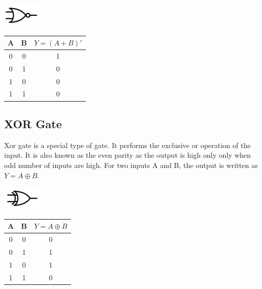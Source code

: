 \documentclass[a4paper, 12pt]{article}
\begin{document}
\begin{minipage}[c]{.5\textwidth}
  \centering
    \includegraphics{nor-gate}
\end{minipage}
\begin{minipage}{.5\textwidth}
  \begin{center}
    \begin{tabular}{ |c|c|c| }
      \hline
      A & B & $Y=(A + B)'$ \\
      \hline
      0 & 0 & 1 \\
      \hline
      0 & 1 & 0 \\
      \hline
      1 & 0 & 0 \\
      \hline
      1 & 1 & 0 \\
      \hline
    \end{tabular}
  \end{center}
\end{minipage}


\subsection{XOR Gate}
Xor gate is a special type of gate. It performs the exclusive or operation of the input. It is also known as the even parity as the output is high only only when odd number of inputs are high. For two inputs A and B, the output is written as $Y = A \oplus B$.

\begin{minipage}[c]{.5\textwidth}
  \centering
    \includegraphics{xor-gate}
\end{minipage}
\begin{minipage}{.5\textwidth}
  \begin{center}
    \begin{tabular}{ |c|c|c| }
      \hline
      A & B & $Y=A\oplus B$ \\
      \hline
      0 & 0 & 0 \\
      \hline
      0 & 1 & 1 \\
      \hline
      1 & 0 & 1 \\
      \hline
      1 & 1 & 0 \\
      \hline
    \end{tabular}
  \end{center}
\end{minipage}
\end{document}
